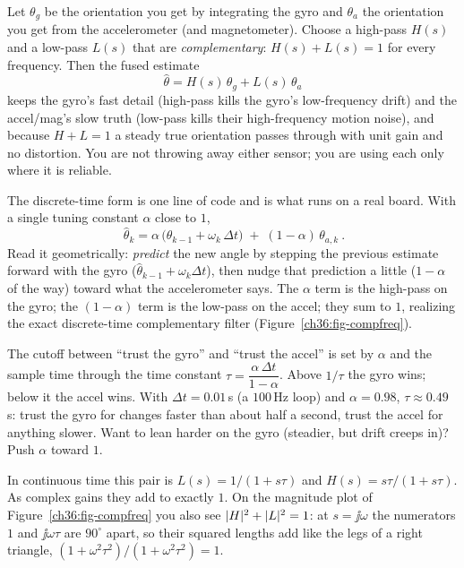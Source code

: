\begin{whybox}
Let $\theta_g$ be the orientation you get by integrating the gyro and $\theta_a$ the
orientation you get from the accelerometer (and magnetometer). Choose a high-pass
$H(s)$ and a low-pass $L(s)$ that are \emph{complementary}: $H(s)+L(s)=1$ for every
frequency. Then the fused estimate
\[
  \hat\theta = H(s)\,\theta_g + L(s)\,\theta_a
\]
keeps the gyro's fast detail (high-pass kills the gyro's low-frequency drift) and the
accel/mag's slow truth (low-pass kills their high-frequency motion noise), and because
$H+L=1$ a steady true orientation passes through with unit gain and no distortion. You
are not throwing away either sensor; you are using each only where it is reliable.
\end{whybox}

The discrete-time form is one line of code and is what runs on a real board. With a
single tuning constant $\alpha$ close to $1$,
\[
  \boxed{\ \hat\theta_k = \alpha\,\big(\hat\theta_{k-1} + \omega_k\,\Delta t\big)
           \;+\; (1-\alpha)\,\theta_{a,k}\ }.
\]
Read it geometrically: \emph{predict} the new angle by stepping the previous estimate
forward with the gyro ($\hat\theta_{k-1}+\omega_k\Delta t$), then nudge that prediction
a little ($1-\alpha$ of the way) toward what the accelerometer says. The $\alpha$ term
is the high-pass on the gyro; the $(1-\alpha)$ term is the low-pass on the accel; they
sum to $1$, realizing the exact discrete-time complementary filter
(Figure~\ref{ch36:fig-compfreq}).

\begin{intuitionbox}
The cutoff between ``trust the gyro'' and ``trust the accel'' is set by $\alpha$ and the
sample time through the time constant $\tau = \dfrac{\alpha\,\Delta t}{1-\alpha}$.
Above $1/\tau$ the gyro wins; below it the accel wins. With $\Delta t = 0.01$\,s (a
$100$\,Hz loop) and $\alpha = 0.98$, $\tau \approx 0.49$\,s: trust the gyro for changes
faster than about half a second, trust the accel for anything slower. Want to lean
harder on the gyro (steadier, but drift creeps in)? Push $\alpha$ toward $1$.

In continuous time this pair is $L(s) = 1/(1+s\tau)$ and $H(s) = s\tau/(1+s\tau)$.
As complex gains they add to exactly $1$. On the magnitude plot of
Figure~\ref{ch36:fig-compfreq} you also see $\lvert H\rvert^2+\lvert L\rvert^2 = 1$: at $s=\jj\omega$ the
numerators $1$ and $\jj\omega\tau$ are $90^\circ$ apart, so their squared lengths add like
the legs of a right triangle, $(1+\omega^2\tau^2)/(1+\omega^2\tau^2) = 1$.
\end{intuitionbox}

